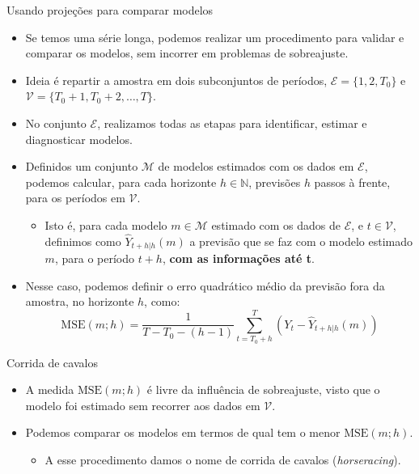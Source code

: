 \documentclass[11pt]{beamer}
\begin{document}
\begin{frame}{Usando projeções para comparar modelos}
\begin{itemize}
	\item Se temos uma série longa, podemos realizar um procedimento para validar e comparar os modelos, sem incorrer em problemas de sobreajuste.
	\item Ideia é repartir a amostra em dois subconjuntos de períodos, $\mathcal{E} = \{1,2,T_0\}$ e $\mathcal{V} = \{T_0+1,T_0+2,\ldots, T\}$.
	\item No conjunto $\mathcal{E}$, realizamos todas as etapas para identificar, estimar e diagnosticar modelos.
	\item Definidos um conjunto $ \mathcal{M}$ de modelos estimados com os dados em $ \mathcal{E}$, podemos calcular, para cada horizonte $h \in \mathbb{N}$, previsões $h$ passos à frente, para os períodos em $\mathcal{V}$.
	\begin{itemize}
 	\item Isto é, para cada modelo $m \in \mathcal{M}$ estimado com os dados de $\mathcal{E}$, e $t \in \mathcal{V}$, definimos como $\hat{Y}_{t+h|h}(m)$ a previsão que se faz com o modelo estimado $m$, para o período $t+h$, \textbf{com as informações até t}.
	\end{itemize}

	\item Nesse caso, podemos definir o erro quadrático médio da previsão fora da amostra, no horizonte $h$, como:
	$$\text{MSE}(m;h) =  \frac{1}{T-T_0-(h-1)}\sum_{t=T_0+h}^{T} (Y_t - \hat{Y}_{t+h|h}(m))$$
	
\end{itemize}
\end{frame}
\begin{frame}{Corrida de cavalos}
	\begin{itemize}
		\item A medida 	$\text{MSE}(m;h)$ é livre da influência de sobreajuste, visto que o modelo foi estimado sem recorrer aos dados em $\mathcal{V}$.
		\item Podemos comparar os modelos em termos de qual tem o menor $\text{MSE}(m;h)$.
		\begin{itemize}
			\item A esse procedimento damos o nome de corrida de cavalos (\textit{horseracing}).
		\end{itemize}
	\end{itemize}
\end{frame}
\end{document}
